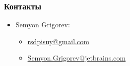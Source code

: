 \documentclass[xcolor=table]{beamer}
\begin{document}
\begin{frame}
\frametitle{Контакты}
\begin{itemize}
  \item Semyon Grigorev:
    \begin{itemize}
      \item \href{mailto:rsdpisuy@gmail.com}{rsdpisuy@gmail.com}
      \item \href{mailto:Semyon.Grigorev@jetbrains.com}{Semyon.Grigorev@jetbrains.com}
    \end{itemize}
\end{itemize}
\end{frame}
\end{document}
